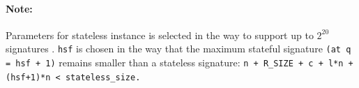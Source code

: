 \paragraph{Note:} Parameters for stateless instance is selected in the way to support up to $2^{20}$ signatures \cite{kudinov_nick_2025_hbs_bitcoin}. \texttt{hsf} is chosen in the way that the maximum stateful signature \texttt{(at q = hsf + 1)} remains smaller than a stateless signature: \texttt{n + R\_SIZE + c + l*n + (hsf+1)*n < stateless\_size.}